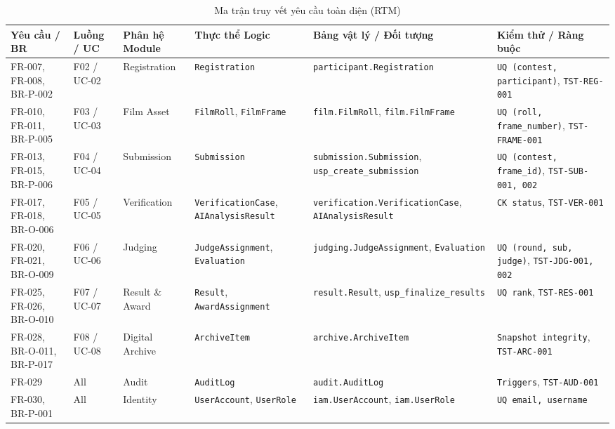 \begin{table}[!ht]
\centering
\caption{Ma trận truy vết yêu cầu toàn diện (RTM)}
\label{tab:c6_rtm}
\tiny
\begin{tabularx}{\textwidth}{p{2.0cm}p{1.1cm}p{1.6cm}p{2.4cm}p{2.8cm}>{\raggedright\arraybackslash}X}
\toprule
\textbf{Yêu cầu / BR} & \textbf{Luồng / UC} & \textbf{Phân hệ Module} & \textbf{Thực thể Logic} & \textbf{Bảng vật lý / Đối tượng} & \textbf{Kiểm thử / Ràng buộc} \\
\midrule
FR-007, FR-008, BR-P-002 & F02 / UC-02 & Registration & \texttt{Registration} & \texttt{participant.\allowbreak Registration} & \texttt{UQ (contest, participant)}, \texttt{TST-REG-001} \\
FR-010, FR-011, BR-P-005 & F03 / UC-03 & Film Asset & \texttt{FilmRoll}, \texttt{FilmFrame} & \texttt{film.FilmRoll}, \texttt{film.FilmFrame} & \texttt{UQ (roll, frame\_number)}, \texttt{TST-FRAME-001} \\
FR-013, FR-015, BR-P-006 & F04 / UC-04 & Submission & \texttt{Submission} & \texttt{submission.\allowbreak Submission}, \texttt{usp\_create\_\allowbreak submission} & \texttt{UQ (contest, frame\_id)}, \texttt{TST-SUB-001, 002} \\
FR-017, FR-018, BR-O-006 & F05 / UC-05 & Verification & \texttt{Verification\allowbreak Case}, \texttt{AIAnalysis\allowbreak Result} & \texttt{verification.\allowbreak VerificationCase}, \texttt{AIAnalysis\allowbreak Result} & \texttt{CK status}, \texttt{TST-VER-001} \\
FR-020, FR-021, BR-O-009 & F06 / UC-06 & Judging & \texttt{Judge\allowbreak Assignment}, \texttt{Evaluation} & \texttt{judging.\allowbreak JudgeAssignment}, \texttt{Evaluation} & \texttt{UQ (round, sub, judge)}, \texttt{TST-JDG-001, 002} \\
FR-025, FR-026, BR-O-010 & F07 / UC-07 & Result \& Award & \texttt{Result}, \texttt{Award\allowbreak Assignment} & \texttt{result.Result}, \texttt{usp\_finalize\_\allowbreak results} & \texttt{UQ rank}, \texttt{TST-RES-001} \\
FR-028, BR-O-011, BR-P-017 & F08 / UC-08 & Digital Archive & \texttt{ArchiveItem} & \texttt{archive.\allowbreak ArchiveItem} & \texttt{Snapshot integrity}, \texttt{TST-ARC-001} \\
FR-029 & All & Audit & \texttt{AuditLog} & \texttt{audit.AuditLog} & \texttt{Triggers}, \texttt{TST-AUD-001} \\
FR-030, BR-P-001 & All & Identity & \texttt{UserAccount}, \texttt{UserRole} & \texttt{iam.UserAccount}, \texttt{iam.UserRole} & \texttt{UQ email, username} \\
\bottomrule
\end{tabularx}
\end{table}

